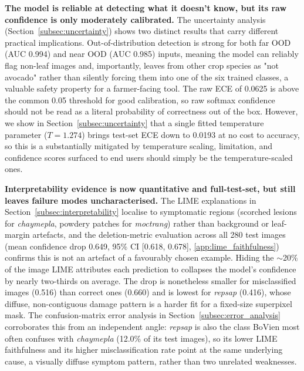 \textbf{The model is reliable at detecting what it doesn't know, but its raw confidence is only moderately calibrated.} The uncertainty analysis (Section~\ref{subsec:uncertainty}) shows two distinct results that carry different practical implications. Out-of-distribution detection is strong for both far OOD (AUC 0.994) and near OOD (AUC 0.985) inputs, meaning the model can reliably flag non-leaf images and, importantly, leaves from other crop species as "not avocado" rather than silently forcing them into one of the six trained classes, a valuable safety property for a farmer-facing tool. The raw ECE of 0.0625 is above the common 0.05 threshold for good calibration, so raw softmax confidence should not be read as a literal probability of correctness out of the box. However, we show in Section~\ref{subsec:uncertainty} that a single fitted temperature parameter ($T=1.274$) brings test-set ECE down to 0.0193 at no cost to accuracy, so this is a substantially mitigated by temperature scaling, limitation, and confidence scores surfaced to end users should simply be the temperature-scaled ones.

\textbf{Interpretability evidence is now quantitative and full-test-set, but still leaves failure modes uncharacterised.} The LIME explanations in Section~\ref{subsec:interpretability} localise to symptomatic regions (scorched lesions for \textit{chaymepla}, powdery patches for \textit{moctrang}) rather than background or leaf-margin artefacts, and the deletion-metric evaluation across all 280 test images (mean confidence drop 0.649, 95\% CI [0.618, 0.678], \ref{app:lime_faithfulness}) confirms this is not an artefact of a favourably chosen example. Hiding the $\sim$20\% of the image LIME attributes each prediction to collapses the model's confidence by nearly two-thirds on average. The drop is nonetheless smaller for misclassified images (0.516) than correct ones (0.660) and is lowest for \textit{repsap} (0.416), whose diffuse, non-contiguous damage pattern is a harder fit for a fixed-size superpixel mask. The confusion-matrix error analysis in Section~\ref{subsec:error_analysis} corroborates this from an independent angle: \textit{repsap} is also the class BoVien most often confuses with \textit{chaymepla} (12.0\% of its test images), so its lower LIME faithfulness and its higher misclassification rate point at the same underlying cause, a visually diffuse symptom pattern, rather than two unrelated weaknesses.

